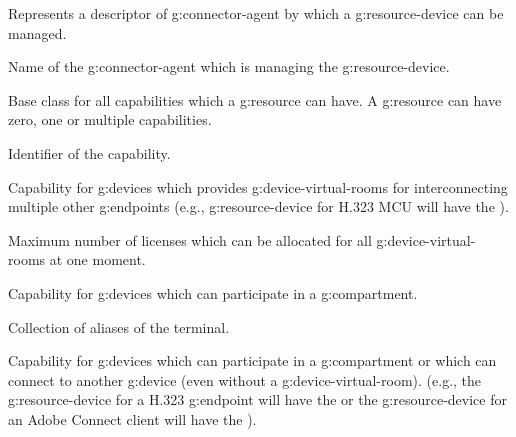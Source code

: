 \begin{Api}
Represents a descriptor of \gls{g:connector-agent} by which a \gls{g:resource-device} can be managed.
\begin{ApiClassAttributes}
 Name of the \gls{g:connector-agent} which is managing the \gls{g:resource-device}.
\end{ApiClassAttributes}

Base class for all capabilities which a \gls{g:resource} can have. A \gls{g:resource} can have zero, one or multiple capabilities.
\begin{ApiClassAttributes}
 Identifier of the capability.
\end{ApiClassAttributes}

 Capability for \glspl{g:device} which provides \glspl{g:device-virtual-room} for interconnecting multiple other \glspl{g:endpoint} (e.g., \gls{g:resource-device} for H.323 MCU will have the ).
\begin{ApiClassAttributes}
 Maximum number of licenses which can be allocated for all \glspl{g:device-virtual-room} at one moment.
\end{ApiClassAttributes}

 Capability for \glspl{g:device} which can participate in a \gls{g:compartment}.
\begin{ApiClassAttributes}
 Collection of aliases of the terminal.
\end{ApiClassAttributes}

 Capability for \glspl{g:device} which can participate in a \gls{g:compartment} or which can connect to another \gls{g:device} (even without a \gls{g:device-virtual-room}).
(e.g., the \gls{g:resource-device} for a H.323 \gls{g:endpoint} will have the  or the \gls{g:resource-device} for an Adobe Connect client will have the ).


\end{Api}
